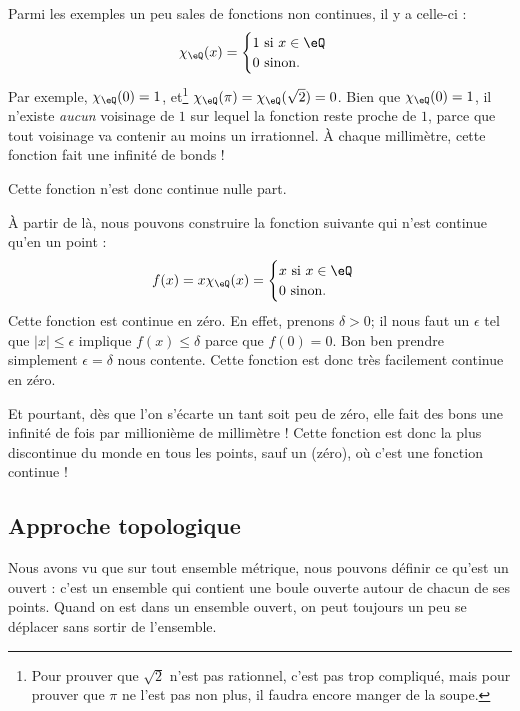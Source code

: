Parmi les exemples un peu sales de fonctions non continues, il y a celle-ci :
\[
	\chi_{\eQ}(x)=
	\begin{cases}
		1 \text{ si }x\in\eQ \\
		0 \text{ sinon.}
	\end{cases}
\]
Par exemple, \( \chi_{\eQ}(0)=1\), et\footnote{Pour prouver que \( \sqrt{2}\) n'est pas rationnel, c'est pas trop compliqué, mais pour prouver que \( \pi\) ne l'est pas non plus, il faudra encore manger de la soupe.} \( \chi_{\eQ}(\pi)=\chi_{\eQ}(\sqrt{2})=0\). Bien que \( \chi_{\eQ}(0)=1\), il n'existe \emph{aucun} voisinage de \( 1\) sur lequel la fonction reste proche de \( 1\), parce que tout voisinage va contenir au moins un irrationnel. À chaque millimètre, cette fonction fait une infinité de bonds !

Cette fonction n'est donc continue nulle part.

À partir de là, nous pouvons construire la fonction suivante qui n'est continue qu'en un point :
\[
	f(x)=x\chi_{\eQ}(x)=
	\begin{cases}
		x\text{ si }x\in\eQ \\
		0\text{ sinon.}
	\end{cases}
\]
Cette fonction est continue en zéro. En effet, prenons \( \delta>0\); il nous faut un \( \epsilon\) tel que \( | x |\leq\epsilon\) implique \( f(x)\leq \delta\) parce que \( f(0)=0\). Bon ben prendre simplement \( \epsilon=\delta\) nous contente. Cette fonction est donc très facilement continue en zéro.

Et pourtant, dès que l'on s'écarte un tant soit peu de zéro, elle fait des bons une infinité de fois par millionième de millimètre ! Cette fonction est donc la plus discontinue du monde en tous les points, sauf un (zéro), où c'est une fonction continue !

\subsection{Approche topologique}

Nous avons vu que sur tout ensemble métrique, nous pouvons définir ce qu'est un ouvert : c'est un ensemble qui contient une boule ouverte autour de chacun de ses points. Quand on est dans un ensemble ouvert, on peut toujours un peu se déplacer sans sortir de l'ensemble.

